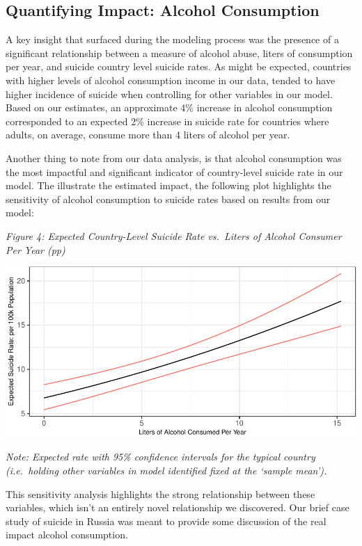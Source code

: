 \documentclass[]{article}
\begin{document}
\subsection{Quantifying Impact: Alcohol
Consumption}\label{quantifying-impact-alcohol-consumption}

A key insight that surfaced during the modeling process was the presence
of a significant relationship between a measure of alcohol abuse, liters
of consumption per year, and suicide country level suicide rates. As
might be expected, countries with higher levels of alcohol consumption
income in our data, tended to have higher incidence of suicide when
controlling for other variables in our model. Based on our estimates, an
approximate 4\% increase in alcohol consumption corresponded to an
expected 2\% increase in suicide rate for countries where adults, on
average, consume more than 4 liters of alcohol per year.

Another thing to note from our data analysis, is that alcohol
consumption was the most impactful and significant indicator of
country-level suicide rate in our model. The illustrate the estimated
impact, the following plot highlights the sensitivity of alcohol
consumption to suicide rates based on results from our model:

\emph{Figure 4: Expected Country-Level Suicide Rate vs.~Liters of
Alcohol Consumer Per Year (pp)}

\begin{center}\includegraphics{Project_Report_files/figure-latex/a_alc_plot-1} \end{center}

\emph{Note: Expected rate with 95\% confidence intervals for the typical
country (i.e.~holding other variables in model identified fixed at the
`sample mean').}

This sensitivity analysis highlights the strong relationship between
these variables, which isn't an entirely novel relationship we
discovered. Our brief case study of suicide in Russia was meant to
provide some discussion of the real impact alcohol consumption.
\end{document}
